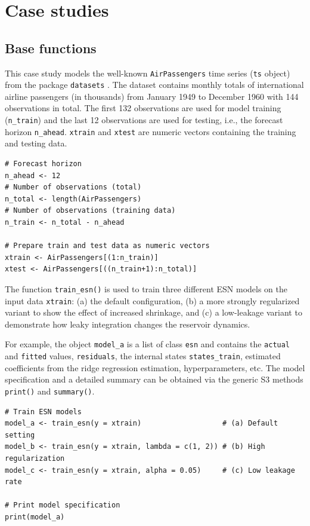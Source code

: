 \section{Case studies}\label{case-studies}

\subsection{Base functions}\label{base-functions}

This case study models the well-known \texttt{AirPassengers} time series (\texttt{ts} object) from the package \texttt{datasets} \citep{rcore}. The dataset contains monthly totals of international airline passengers (in thousands) from January 1949 to December 1960 with 144 observations in total. The first 132 observations are used for model training (\texttt{n\_train}) and the last 12 observations are used for testing, i.e., the forecast horizon \texttt{n\_ahead}. \texttt{xtrain} and \texttt{xtest} are numeric vectors containing the training and testing data.

\begin{verbatim}
# Forecast horizon
n_ahead <- 12
# Number of observations (total)
n_total <- length(AirPassengers)
# Number of observations (training data)
n_train <- n_total - n_ahead

# Prepare train and test data as numeric vectors
xtrain <- AirPassengers[(1:n_train)]
xtest <- AirPassengers[((n_train+1):n_total)]
\end{verbatim}

The function \texttt{train\_esn()} is used to train three different ESN models on the input data \texttt{xtrain}: (a) the default configuration, (b) a more strongly regularized variant to show the effect of increased shrinkage, and (c) a low-leakage variant to demonstrate how leaky integration changes the reservoir dynamics.

For example, the object \texttt{model\_a} is a list of class \texttt{esn} and contains the \texttt{actual} and \texttt{fitted} values, \texttt{residuals}, the internal states \texttt{states\_train}, estimated coefficients from the ridge regression estimation, hyperparameters, etc. The model specification and a detailed summary can be obtained via the generic S3 methods \texttt{print()} and \texttt{summary()}.

\begin{verbatim}
# Train ESN models
model_a <- train_esn(y = xtrain)                   # (a) Default setting
model_b <- train_esn(y = xtrain, lambda = c(1, 2)) # (b) High regularization
model_c <- train_esn(y = xtrain, alpha = 0.05)     # (c) Low leakage rate

# Print model specification
print(model_a)
\end{verbatim}

